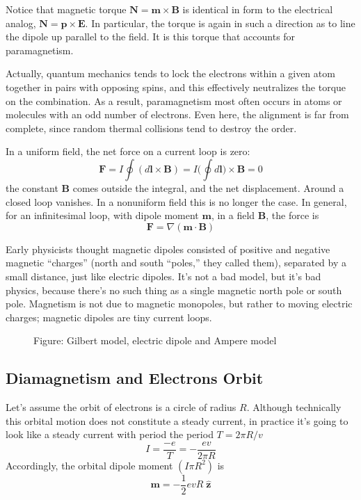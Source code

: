 \documentclass[../../../main.tex]{subfiles}
\begin{document}
Notice that magnetic torque $ \mathbf{N}=\mathbf{m}\times\mathbf{B}$ is identical in form to the electrical analog, $\mathbf{N} = \mathbf{p} \times \mathbf{E}$. In particular, the torque is again in such a direction as to line the dipole up parallel to the ﬁeld. It is this torque that accounts for paramagnetism.

Actually, quantum mechanics tends to lock the electrons within a given atom together in pairs with opposing spins, and this effectively neutralizes the torque on the combination. As a result, paramagnetism most often occurs in atoms or molecules with an odd number of electrons. Even here, the alignment is far from complete, since random thermal collisions tend to destroy the order.

In a uniform ﬁeld, the net force on a current loop is zero:
\begin{equation*}
    \mathbf{F}=I\oint (d\mathbf{l}\times \mathbf{B})=I\biggl(\oint d\mathbf{l}\biggr)\times \mathbf{B}=0
\end{equation*}
the constant \textbf{B} comes outside the integral, and the net displacement. Around a closed loop vanishes. In a nonuniform ﬁeld this is no longer the case. In general, for an inﬁnitesimal loop, with dipole moment $\mathbf{m}$, in a ﬁeld \textbf{B}, the force is
\begin{equation*}
    \mathbf{F}=\nabla(\mathbf{m}\cdot\mathbf{B})
\end{equation*}

Early physicists thought magnetic dipoles consisted of positive and negative magnetic “charges” (north and south “poles,” they called them), separated by a small distance, just like electric dipoles. It’s not a bad model, but it’s bad physics, because there’s no such thing as a single magnetic north pole or south pole. Magnetism is not due to magnetic monopoles, but rather to moving electric charges; magnetic dipoles are tiny current loops.
\begin{figure}
    \centering
    \caption*{Figure: Gilbert model, electric dipole and Ampere model}
\end{figure}

\subsection{Diamagnetism and Electrons Orbit}
Let’s assume the  orbit of electrons is a circle of radius $R$. Although technically this orbital motion does not constitute a steady current, in practice it's going to look like a steady current with period the period $T = 2\pi R/v$
\begin{equation*}
    I=\frac{-e}{T}=-\frac{ev}{2\pi R}
\end{equation*}
Accordingly, the orbital dipole moment $(I \pi R^2)$ is
\begin{equation*}
    \mathbf{m}=-\frac{1}{2}evR \;\mathbf{\hat{z}}
\end{equation*}
\end{document}
